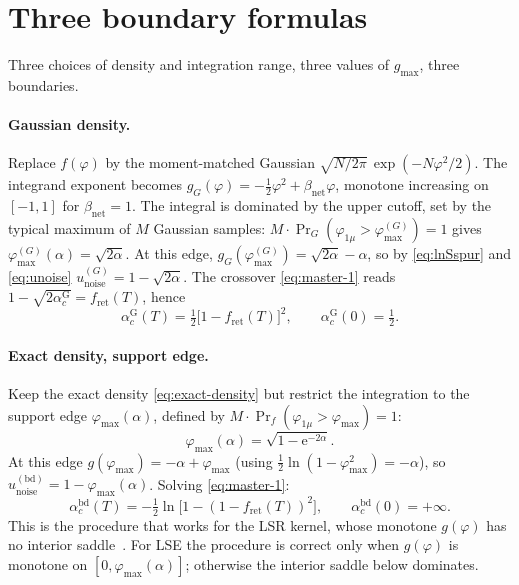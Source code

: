 \documentclass[11pt]{article}
\newcommand{\e}{{\mathrm{e}}}
\newcommand{\Bnet}{\beta_{\mathrm{net}}}
\newcommand{\fret}{f_{\mathrm{ret}}}
\newcommand{\acGauss}{\alpha_c^{\mathrm{G}}}
\newcommand{\acBd}{\alpha_c^{\mathrm{bd}}}
\begin{document}
\section{Three boundary formulas}
\label{sec:formulas}

Three choices of density and integration range, three values of
$g_{\max}$, three boundaries.

\paragraph{Gaussian density.}
Replace $f(\varphi)$ by the moment-matched Gaussian
$\sqrt{N/2\pi}\,\exp(-N \varphi^2 / 2)$.  The integrand exponent
becomes $g_G(\varphi) = -\tfrac12 \varphi^2 + \Bnet \varphi$, monotone
increasing on $[-1, 1]$ for $\Bnet = 1$.  The integral is dominated by
the upper cutoff, set by the typical maximum of $M$ Gaussian samples:
$M \cdot \Pr_G(\varphi_{1\mu} > \varphi_{\max}^{(G)}) = 1$ gives
$\varphi_{\max}^{(G)}(\alpha) = \sqrt{2\alpha}$.  At this edge,
$g_G(\varphi_{\max}^{(G)}) = \sqrt{2\alpha} - \alpha$, so by
\eqref{eq:lnSspur} and \eqref{eq:unoise}
$u_{\mathrm{noise}}^{(G)} = 1 - \sqrt{2\alpha}$.  The crossover
\eqref{eq:master-1} reads $1 - \sqrt{2 \acGauss} = \fret(T)$, hence
\begin{equation}
\acGauss(T) = \tfrac12 \bigl[1 - \fret(T)\bigr]^2,
\qquad \acGauss(0) = \tfrac12.
\label{eq:acgauss}
\end{equation}

\paragraph{Exact density, support edge.}
Keep the exact density \eqref{eq:exact-density} but restrict the
integration to the support edge $\varphi_{\max}(\alpha)$, defined by
$M \cdot \Pr_f(\varphi_{1\mu} > \varphi_{\max}) = 1$:
\begin{equation}
\varphi_{\max}(\alpha) = \sqrt{1 - \e^{-2\alpha}}.
\label{eq:phimax-exact}
\end{equation}
At this edge $g(\varphi_{\max}) = -\alpha + \varphi_{\max}$ (using
$\tfrac12 \ln(1 - \varphi_{\max}^2) = -\alpha$), so
$u_{\mathrm{noise}}^{(\mathrm{bd})} = 1 - \varphi_{\max}(\alpha)$.
Solving \eqref{eq:master-1}:
\begin{equation}
\acBd(T) = -\tfrac12 \ln\!\bigl[1 - (1 - \fret(T))^2\bigr],
\qquad \acBd(0) = +\infty.
\label{eq:acbd}
\end{equation}
This is the procedure that works for the LSR kernel, whose monotone
$g(\varphi)$ has no interior saddle~\citep{petrova2026metastable}.
For LSE the procedure is correct only when $g(\varphi)$ is monotone on
$[0, \varphi_{\max}(\alpha)]$; otherwise the interior saddle below
dominates.
\end{document}
